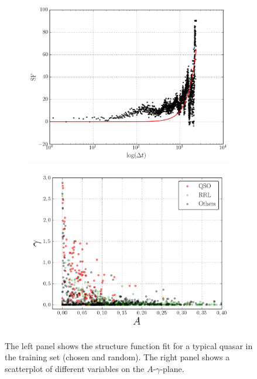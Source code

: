 

\begin{figure}[h]
	\centering
	\begin{subfigure}[t]{0.49\textwidth}
		\centering
		\label{fig:2e}
		\includegraphics[width=\textwidth]{figures/sf/sf-fit.png}		
	\end{subfigure}
	\begin{subfigure}[t]{0.49\textwidth}
		\centering
		\label{fig:2f}
		\includegraphics[width=\textwidth]{figures/sf/sf-scatterplot.png}		
	\end{subfigure}
	\caption[Structure function features]{The left panel shows the structure function fit for a typical quasar in the training set (chosen and random). The right panel shows a scatterplot of different variables on the $A$-$\gamma$-plane.}
	\label{fig:features-scatterplot}
\end{figure}


